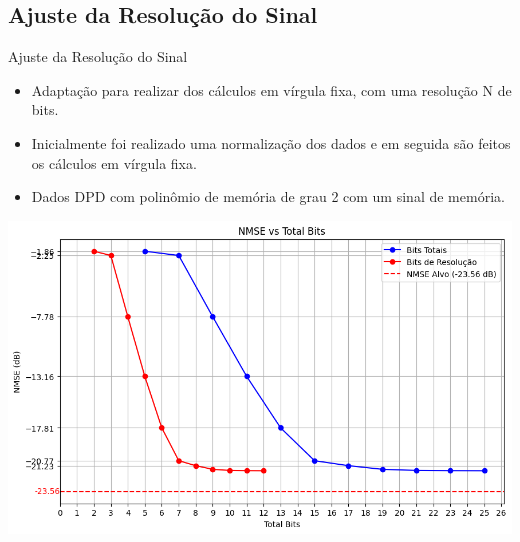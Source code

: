 \documentclass{if-beamer}
\begin{document}
\subsection{Ajuste da Resolução do Sinal}
\begin{frame}{Ajuste da Resolução do Sinal}
	\begin{minipage}{0.5\textwidth}
		\begin{itemize}
			\item Adaptação para realizar dos cálculos em vírgula fixa, com uma resolução N de bits.
			\item Inicialmente foi realizado uma normalização dos dados e em seguida são feitos os cálculos em vírgula fixa.
			\item  Dados DPD com polinômio 	de memória de grau 2 com 
			um sinal de memória.
		\end{itemize}
	\end{minipage}%
	\hspace{0.04\textwidth}
	\begin{minipage}{0.5\textwidth}
	\includegraphics[scale=0.25]{bits.png}
	\end{minipage}
\end{frame}
\end{document}
